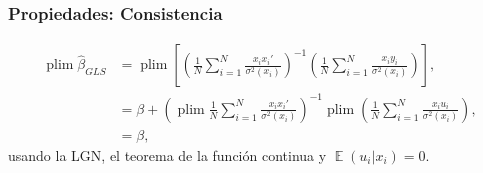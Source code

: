 \documentclass[t, compress, spanish, aspectratio=169]{beamer}
\DeclareMathOperator{\plim}{plim}
\DeclareMathOperator{\E}{\mathbb{E}}
\begin{document}
\begin{frame}
    \frametitle{Propiedades: Consistencia}
        \begin{align*}
            \plim \hat \beta_{GLS} & = \plim\left[ \left( \frac{1}{N}\sum_{i=1}^{N} \frac{x_ix_i'}{\sigma^2(x_i)}\right)^{-1}\left( \frac{1}{N} \sum_{i=1}^{N} \frac{x_iy_i}{\sigma^2(x_i)}\right)\right],\\
            & = \beta + \left( \plim \frac{1}{N}\sum_{i=1}^{N} \frac{x_ix_i'}{\sigma^2(x_i)}\right)^{-1}\plim\left( \frac{1}{N} \sum_{i=1}^{N} \frac{x_iu_i}{\sigma^2(x_i)}\right),\\
            & = \beta,
        \end{align*}
        usando la LGN, el teorema de la funci\'on continua y $\E(u_i|x_i)=0$.
\end{frame}
%
\end{document}
